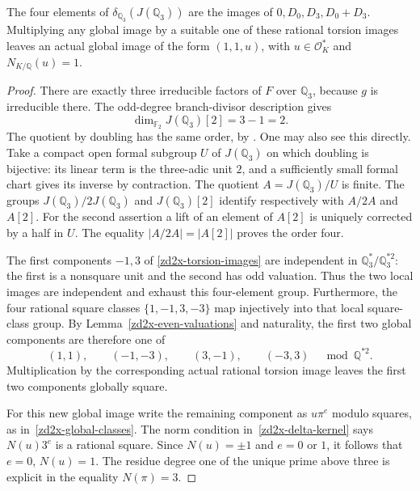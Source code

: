 \begin{lemma}
\label{zd2x-three-adic}
The four elements of \(\delta_{\mathbb Q_3}(J(\mathbb Q_3))\)
are the images of \(0,D_0,D_3,D_0+D_3\).
Multiplying any global image by a suitable one of these
rational torsion images leaves an actual global image of
the form \((1,1,u)\), with \(u\in\mathcal O_K^*\) and
\(N_{K/\mathbb Q}(u)=1\).
\end{lemma}
\begin{proof}
There are exactly three irreducible factors of \(F\) over
\(\mathbb Q_3\), because \(g\) is irreducible there.
The odd-degree branch-divisor description
\cite[Lemma~4.3(3)]{StollTwoDescent2001} gives
\[
 \dim_{\mathbb F_2}J(\mathbb Q_3)[2]=3-1=2.
\]
The quotient by doubling has the same order, by
\cite[Lemma~4.4(1)]{StollTwoDescent2001}. One may also see
this directly. Take a compact open formal subgroup \(U\)
of \(J(\mathbb Q_3)\) on which doubling is bijective: its
linear term is the three-adic unit \(2\), and a sufficiently
small formal chart gives its inverse by contraction.
The quotient \(A=J(\mathbb Q_3)/U\) is finite. The groups
\(J(\mathbb Q_3)/2J(\mathbb Q_3)\) and \(J(\mathbb Q_3)[2]\)
identify respectively with \(A/2A\) and \(A[2]\).
For the second assertion a lift of an element of \(A[2]\)
is uniquely corrected by a half in \(U\).
The equality \(|A/2A|=|A[2]|\) proves the order four.

The first components \(-1,3\) of
\eqref{zd2x-torsion-images} are independent in
\(\mathbb Q_3^*/\mathbb Q_3^{*2}\): the first is a nonsquare
unit and the second has odd valuation. Thus the two local
images are independent and exhaust this four-element group.
Furthermore, the four rational square classes
\(\{1,-1,3,-3\}\) map injectively into that local square-class
group. By Lemma~\ref{zd2x-even-valuations} and naturality,
the first two global components are therefore one of
\begin{equation}
 (1,1),\qquad(-1,-3),\qquad(3,-1),\qquad(-3,3)
 \quad\bmod\mathbb Q^{*2}.
 \label{zd2x-local-matching}
\end{equation}
Multiplication by the corresponding actual rational torsion
image leaves the first two components globally square.

For this new global image write the remaining component as
\(u\pi^e\) modulo squares, as in~\eqref{zd2x-global-classes}.
The norm condition in~\eqref{zd2x-delta-kernel} says
\(N(u)3^e\) is a rational square. Since \(N(u)=\pm1\)
and \(e=0\) or \(1\), it follows that \(e=0\), \(N(u)=1\).
The residue degree one of the unique prime above three
is explicit in the equality \(N(\pi)=3\).
\end{proof}

